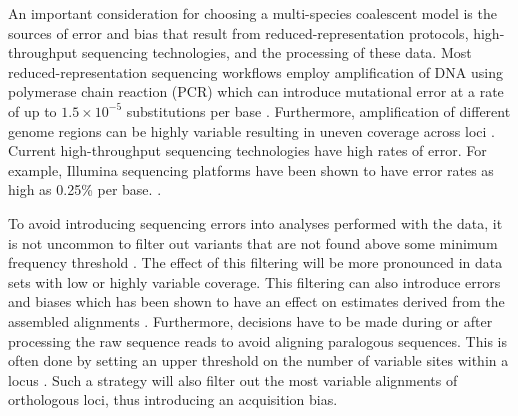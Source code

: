 An important consideration for choosing a multi-species coalescent model is
the sources of error and bias that result from reduced-representation protocols,
high-throughput sequencing technologies, and the processing of these data.
Most reduced-representation sequencing workflows employ amplification of DNA  
using polymerase chain reaction (PCR) which can introduce mutational error at a 
rate of up to $1.5\times10^{-5}$ substitutions per base \citep{potapovExaminingSourcesError2017}.
Furthermore, amplification of different genome regions can be highly variable 
resulting in uneven coverage across loci \citep{airdAnalyzingMinimizingPCR2011}. 
Current high-throughput sequencing technologies have high rates of error.
For example, Illumina sequencing platforms have been shown to have error rates
as high as 0.25\% per base. \citep{pfeifferSystematicEvaluationError2018}. 


To avoid introducing sequencing errors into analyses performed with the data, it is not 
uncommon to filter out variants that are not found above some minimum frequency 
threshold \citep{rochetteStacksAnalyticalMethods2019, linckMinorAlleleFrequency2019}. 
The effect of this filtering will be more pronounced in data sets with low or 
highly variable coverage.
This filtering can also introduce errors and biases which has been 
shown to have an effect on estimates derived from the assembled alignments
\citep{Harvey2015,linckMinorAlleleFrequency2019}.
Furthermore, decisions have to be made during or after processing
the raw sequence reads to avoid aligning paralogous sequences.
This is often done by setting an upper threshold on the number of variable
sites within a locus \citep{harveySimilarityThresholdsUsed2015}. 
Such a strategy will also filter out the most variable alignments
of orthologous loci, thus introducing an acquisition bias.









